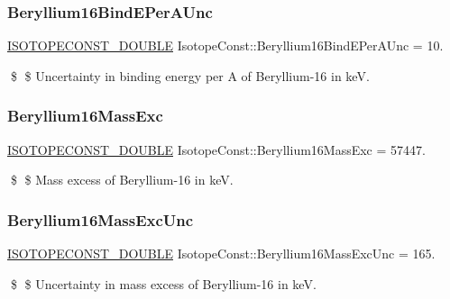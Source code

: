 \subsubsection{\texorpdfstring{Beryllium16\+Bind\+E\+Per\+A\+Unc}{Beryllium16BindEPerAUnc}}
{\footnotesize\ttfamily \mbox{\hyperlink{group___isotope_const-_macros_ga8f45a7272ce02c0b4c65c44636ed719a}{I\+S\+O\+T\+O\+P\+E\+C\+O\+N\+S\+T\+\_\+\+D\+O\+U\+B\+LE}} Isotope\+Const\+::\+Beryllium16\+Bind\+E\+Per\+A\+Unc = 10.}

\$ \$ Uncertainty in binding energy per A of Beryllium-\/16 in keV. \mbox{\label{group___isotope_const-_beryllium-_be16_ga3f4948faa5d4d55f3cbe041713c008b4}} 
\subsubsection{\texorpdfstring{Beryllium16\+Mass\+Exc}{Beryllium16MassExc}}
{\footnotesize\ttfamily \mbox{\hyperlink{group___isotope_const-_macros_ga8f45a7272ce02c0b4c65c44636ed719a}{I\+S\+O\+T\+O\+P\+E\+C\+O\+N\+S\+T\+\_\+\+D\+O\+U\+B\+LE}} Isotope\+Const\+::\+Beryllium16\+Mass\+Exc = 57447.}

\$ \$ Mass excess of Beryllium-\/16 in keV. \mbox{\label{group___isotope_const-_beryllium-_be16_ga1f7992b858dc8ebbddbf3b5f74c151e6}} 
\subsubsection{\texorpdfstring{Beryllium16\+Mass\+Exc\+Unc}{Beryllium16MassExcUnc}}
{\footnotesize\ttfamily \mbox{\hyperlink{group___isotope_const-_macros_ga8f45a7272ce02c0b4c65c44636ed719a}{I\+S\+O\+T\+O\+P\+E\+C\+O\+N\+S\+T\+\_\+\+D\+O\+U\+B\+LE}} Isotope\+Const\+::\+Beryllium16\+Mass\+Exc\+Unc = 165.}

\$ \$ Uncertainty in mass excess of Beryllium-\/16 in keV. \mbox{\label{group___isotope_const-_beryllium-_be16_ga96303901bbc4c1520a15112aef28a69b}} 
